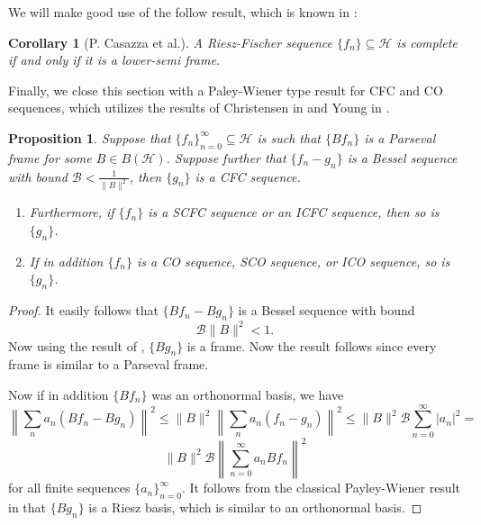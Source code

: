 \documentclass[11pt]{amsart}
\newtheorem{prop}[thm]{Proposition}
\newtheorem*{cor*}{Corollary}
\theoremstyle{definition}
\numberwithin{equation}{section}
\newcommand{\Hcal}{\mathcal{H}} %
\begin{document}
We will make good use of the follow result, which is known in \cite{Casazza2002Riesz-Fischer}:

\begin{cor*}[P. Casazza et al.]\label{RFcor}
A Riesz-Fischer sequence $\{f_n\}\subseteq \Hcal$ is complete if and only if it is a lower-semi frame.
\end{cor*}


Finally, we close this section with a Paley-Wiener type result for CFC and CO sequences, which utilizes the results of Christensen in \cite{Christensen1995Paley-Wiener} and Young in \cite{Young1980Nonharmonic}.

\begin{prop}
Suppose that $\{f_n\}_{n=0}^{\infty}\subseteq \Hcal$ is such that $\{Bf_n\}$ is a Parseval frame for some $B\in B(\Hcal)$. Suppose further that $\{f_n-g_n\}$ is a Bessel sequence with bound $\mathcal{B}<\frac{1}{\|B\|^2}$, then $\{g_n\}$ is a CFC sequence.

\begin{enumerate}
    \item Furthermore, if $\{f_n\}$ is a SCFC sequence or an ICFC sequence, then so is $\{g_n\}$.
    \item If in addition $\{f_n\}$ is a CO sequence, SCO sequence, or ICO sequence, so is $\{g_n\}$.
\end{enumerate}



\end{prop}
\begin{proof}
It easily follows that $\{Bf_n-Bg_n\}$ is a Bessel sequence with bound $$\mathcal{B}\|B\|^2<1.$$ Now using the result of \cite{Christensen1995Paley-Wiener}, $\{Bg_n\}$ is a frame. Now the result follows since every frame is similar to a Parseval frame.

Now if in addition $\{Bf_n\}$ was an orthonormal basis, we have
$$\left\|\sum_{n}a_n (Bf_n-Bg_n) \right\|^2 \leq \|B\|^2 \left\|\sum_{n}a_n (f_n-g_n) \right\|^2 \leq \|B\|^2 \mathcal {B} \sum_{n=0}^{\infty}|a_n|^2=$$
$$\|B\|^2 \mathcal {B} \left\|\sum_{n=0}^{\infty}a_n Bf_n \right\|^2$$ for all finite sequences $\{a_n\}_{n=0}^{\infty}.$
It follows from the classical Payley-Wiener result in \cite{Young1980Nonharmonic} that $\{Bg_n\}$ is a Riesz basis, which is similar to an orthonormal basis.
\end{proof}
\end{document}
